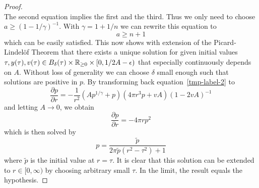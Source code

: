 \begin{proof}
\begin{equation}
	\end{equation}
	The second equation implies the first and the third.
	Thus we only need to choose $a\geq(1-1/\gamma)^{-1}$.
	With $\gamma=1+1/n$ we can rewrite this equation to
	\begin{equation}
		a\geq n+1
		\label{eq:99-App-TOV-No-Mass-Ineq-1}
	\end{equation}
	which can be easily satisfied.
	This now shows with extension of the Picard-Lindelöf Theorem that there exists a unique solution for given initial values $\tau, y(\tau), v(\tau)\in B_{\delta}(\tau)\times\mathbb{R}_{\geq0}\times[0,1/2A-\epsilon)$ that especially continuously depends on $A$.
	Without loss of generality we can choose $\delta$ small enough such that solutions are positive in $p$.
	By transforming back equation~\ref{tmp-label-2} to
	\begin{equation}
		\frac{\partial p}{\partial r} = -\frac{1}{r^2}\left(Ap^{1/\gamma}+p\right)\left(4\pi r^3 p+vA\right)\left(1-2vA\right)^{-1}
		\label{eq:99-App-TOV-No-Mass-TOV-Eq-Normal}
	\end{equation}
	and letting $A\rightarrow0$, we obtain
	\begin{equation}
		\frac{\partial p}{\partial r} = - 4\pi rp^2
		\label{eq:99-App-TOV-No-Mass-TOV-Eq-No-Mass}
	\end{equation}
	which is then solved by
	\begin{equation}
		p = \frac{\tilde{p}}{2\pi\tilde{p}(r^2-\tau^2)+1}
		\label{eq:99-App-TOV-No-Mass-Sol-1}
	\end{equation}
	where $\tilde{p}$ is the initial value at $r=\tau$.
	It is clear that this solution can be extended to $r\in[0,\infty)$ by choosing arbitrary small $\tau$.
	In the limit, the result equals the hypothesis.
\end{proof}
%
%
%

